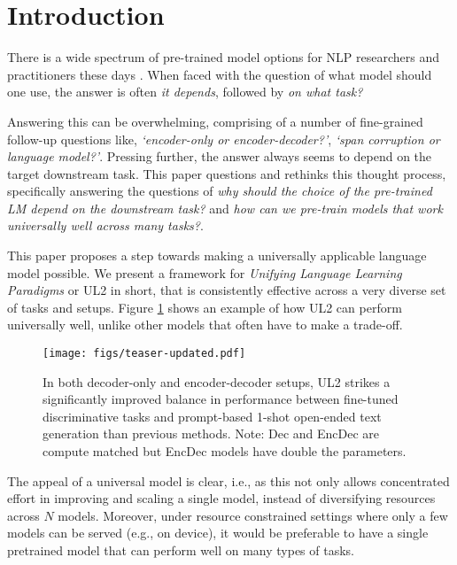\documentclass[10pt]{article}
\begin{document}
\tableofcontents
\newpage
\section{Introduction}



There is a wide spectrum of pre-trained model options for NLP researchers and practitioners these days \citep{devlin2018bert,brown2020language,raffel2019exploring,Radford2019,liu2019roberta,yang2019xlnet, thoppilan2022lamda,fedus2021switch,du2021glam,chowdhery2022palm}. When faced with the question of what model should one use, the answer is often \textit{it depends}, followed by \textit{on what task?}

Answering this can be overwhelming, comprising of a number of fine-grained follow-up questions like, \textit{`encoder-only or encoder-decoder?'}, \textit{`span corruption or language model?'}. Pressing further, the answer always seems to depend on the target downstream task. This paper questions and rethinks this thought process, specifically answering the questions of \textit{why should the choice of the pre-trained LM depend on the downstream task?} and \textit{how can we pre-train models that work universally well across many tasks?}.

This paper proposes a step towards making a universally applicable language model possible. We present a framework for \textit{Unifying Language Learning Paradigms} or UL2 in short, that is consistently effective across a very diverse set of tasks and setups. Figure \ref{fig:UL2-scatter} shows an example of how UL2 can perform universally well, unlike other models that often have to make a trade-off.

\begin{figure}[H]
    \centering
\texttt{[image: figs/teaser-updated.pdf]}
    \captionsetup{width=\linewidth}
\caption{In both decoder-only and encoder-decoder setups, UL2 strikes a significantly improved balance in performance between fine-tuned discriminative tasks and prompt-based 1-shot open-ended text generation than previous methods. Note: Dec and EncDec are compute matched but EncDec models have double the parameters.}
  \label{fig:UL2-scatter}
\vspace{-1em}
\end{figure}

The appeal of a universal model is clear, i.e., as this not only allows concentrated effort in improving and scaling a single model, instead of diversifying resources across $N$ models. Moreover, under resource constrained settings where only a few models can be served (e.g., on device), it would be preferable to have a single pretrained model that can perform well on many types of tasks.
\end{document}

